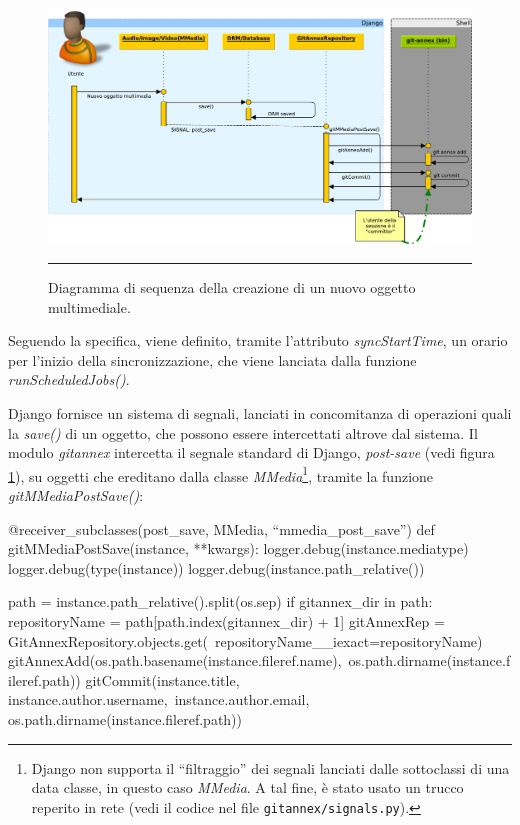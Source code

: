 \begin{figure}[htbp]
  \centering
  \includegraphics[width=\textwidth]{./Figure/SequenceDiagram_NuovoOggetto-crop.pdf}
  \rule{35em}{0.5pt}
  \caption[Diagramma di sequenza della creazione di un nuovo oggetto
  multimediale]{Diagramma di sequenza della creazione di un nuovo
    oggetto multimediale.}
  \label{fig:SequenceDiagramAdd}
\end{figure}

Seguendo la specifica, viene definito, tramite l'attributo
\emph{syncStartTime}, un orario per l'inizio della sincronizzazione,
che viene lanciata dalla funzione \emph{runScheduledJobs()}.

Django fornisce un sistema di segnali, lanciati in concomitanza di
operazioni quali la \emph{save()} di un oggetto, che possono essere
intercettati altrove dal sistema. Il modulo \emph{gitannex} intercetta
il segnale standard di Django, \emph{post-save} (vedi figura
\ref{fig:SequenceDiagramAdd}), su oggetti che ereditano dalla classe
\emph{MMedia}\footnote{Django non supporta il ``filtraggio'' dei
  segnali lanciati dalle sottoclassi di una data classe, in questo
  caso \emph{MMedia}. A tal fine, è stato usato un trucco reperito in
  rete (vedi il codice nel file \texttt{gitannex/signals.py}).},
tramite la funzione \emph{gitMMediaPostSave()}:


\begin{code}
@receiver_subclasses(post_save, MMedia, ``mmedia_post_save'')
def gitMMediaPostSave(instance, **kwargs):
    logger.debug(instance.mediatype)
    logger.debug(type(instance))
    logger.debug(instance.path_relative())

    path = instance.path_relative().split(os.sep)
    if gitannex_dir in path:
        repositoryName = path[path.index(gitannex_dir) + 1]
        gitAnnexRep = GitAnnexRepository.objects.get(\
                      repositoryName__iexact=repositoryName)
        gitAnnexAdd(os.path.basename(instance.fileref.name),\
                    os.path.dirname(instance.fileref.path))
        gitCommit(instance.title, instance.author.username,\
                  instance.author.email, os.path.dirname(instance.fileref.path))
\end{code}








